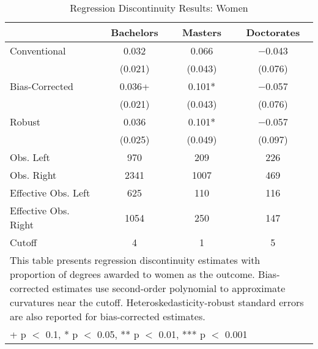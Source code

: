 \begin{table}

\caption{Regression Discontinuity Results: Women}
\centering
\begin{tabular}[t]{lccc}
\toprule
  & Bachelors & Masters & Doctorates\\
\midrule
Conventional & \num{0.032} & \num{0.066} & \num{-0.043}\\
 & (\num{0.021}) & (\num{0.043}) & \vphantom{1} (\num{0.076})\\
Bias-Corrected & \num{0.036}+ & \num{0.101}* & \num{-0.057}\\
 & (\num{0.021}) & (\num{0.043}) & (\num{0.076})\\
Robust & \num{0.036} & \num{0.101}* & \num{-0.057}\\
 & (\num{0.025}) & (\num{0.049}) & (\num{0.097})\\
\midrule
Obs. Left & \num{970} & \num{209} & \num{226}\\
Obs. Right & \num{2341} & \num{1007} & \num{469}\\
Effective Obs. Left & \num{625} & \num{110} & \num{116}\\
Effective Obs. Right & \num{1054} & \num{250} & \num{147}\\
Cutoff & \num{4} & \num{1} & \num{5}\\
\bottomrule
\multicolumn{4}{l}{\rule{0pt}{1em}This table presents regression discontinuity estimates
                with proportion of degrees awarded to women
                as the outcome. Bias-corrected estimates use second-order polynomial
                to approximate curvatures near the cutoff. Heteroskedasticity-robust
                standard errors are also reported for bias-corrected estimates.}\\
\multicolumn{4}{l}{\rule{0pt}{1em}+ p $<$ 0.1, * p $<$ 0.05, ** p $<$ 0.01, *** p $<$ 0.001}\\
\end{tabular}
\end{table}
